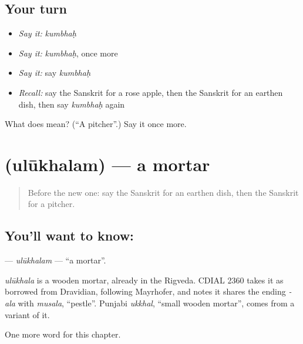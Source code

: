 \subsection*{Your turn}
\begin{itemize}
\raggedright
  \item \emph{Say it:} \emph{kumbhaḥ}
  \item \emph{Say it:} \emph{kumbhaḥ}, once more
  \item \emph{Say it:} say \emph{kumbhaḥ}
  \item \emph{Recall:} say the Sanskrit for a rose apple, then the Sanskrit for an earthen dish, then say \emph{kumbhaḥ} again
\end{itemize}

\begin{tcolorbox}[breakable,colback=teal!4,colframe=teal!35!black,title={Before you move on}]
What does  mean? (\textquotedblleft{}A pitcher\textquotedblright{}.) Say it once more.
\end{tcolorbox}
\section[\texorpdfstring{\sk{उलूखलम्} (ulūkhalam)}{उलूखलम् (ulūkhalam)}]{ (ulūkhalam) — a mortar}

\label{lesson:SA-C191-ulukhalam}



\begin{quote}
Before the new one: say the Sanskrit for an earthen dish, then the Sanskrit for a pitcher.
\end{quote}

\subsection*{You'll want to know: }
\textbf{} — \emph{ulūkhalam} — \textquotedblleft{}a mortar\textquotedblright{}.

\begin{cousinweb}
\emph{ulūkhala} is a wooden mortar, already in the Rigveda. CDIAL 2360 takes it as borrowed from Dravidian, following Mayrhofer, and notes it shares the ending \emph{-ala} with \emph{musala}, \textquotedblleft{}pestle\textquotedblright{}. Punjabi \emph{ukkhal}, \textquotedblleft{}small wooden mortar\textquotedblright{}, comes from a variant of it.
\end{cousinweb}

\begin{grammarlens}[title={What you've built}]
One more word for this chapter.
\end{grammarlens}

